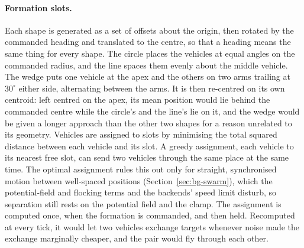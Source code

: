 \paragraph{Formation slots.} Each shape is generated as a set of offsets about the origin, then
rotated by the commanded heading and translated to the centre, so that a heading means the same
thing for every shape. The circle places the vehicles at equal angles on the commanded radius, and
the line spaces them evenly about the middle vehicle. The wedge puts one vehicle at the apex and the
others on two arms trailing at $30^\circ$ either side, alternating between the arms. It is then
re-centred on its own centroid: left centred on the apex, its mean position would lie behind the
commanded centre while the circle's and the line's lie on it, and the wedge would be given a longer
approach than the other two shapes for a reason unrelated to its geometry. Vehicles are assigned to
slots by minimising the total squared distance between each vehicle and its slot. A greedy
assignment, each vehicle to its nearest free slot, can send two vehicles through the same place at
the same time. The optimal assignment rules this out only for straight, synchronised motion between
well-spaced positions (Section~\ref{sec:bg-swarm}), which the potential-field and flocking terms and
the backends' speed limit disturb, so separation still rests on the potential field and the clamp.
The assignment is computed once, when the formation is
commanded, and then held. Recomputed at every tick, it would let two vehicles exchange targets
whenever noise made the exchange marginally cheaper, and the pair would fly through each other.

